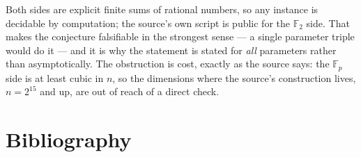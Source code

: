 \documentclass{aicr-conjecture}
\newcommand{\F}{\mathbb{F}}
\begin{document}
\begin{remark}
Both sides are explicit finite sums of rational numbers, so any instance
is decidable by computation; the source's own script is public for the
$\F_{2}$ side. That makes the conjecture falsifiable in the strongest
sense --- a single parameter triple would do it --- and it is why the
statement is stated for \emph{all} parameters rather than
asymptotically. The obstruction is cost, exactly as the source says: the
$\F_{p}$ side is at least cubic in $n$, so the dimensions where the
source's construction lives, $n = 2^{15}$ and up, are out of reach of a
direct check.
\end{remark}

\section{Bibliography}
\end{document}
